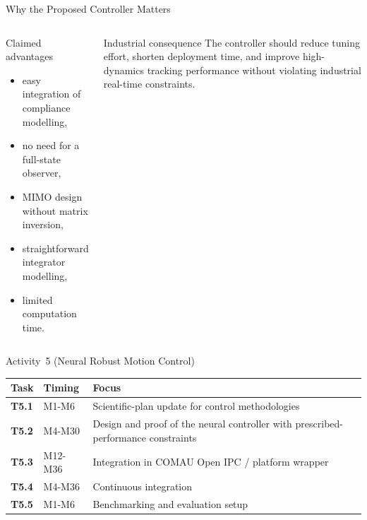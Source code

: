 \documentclass[aspectratio=169,10pt]{beamer}
\begin{document}
\begin{frame}{Why the Proposed Controller Matters}

\begin{columns}[T,totalwidth=\textwidth]
\begin{block}{Claimed advantages}
\begin{itemize}
  \item easy integration of compliance modelling,
  \item no need for a full-state observer,
  \item MIMO design without matrix inversion,
  \item straightforward integrator modelling,
  \item limited computation time.
\end{itemize}
\end{block}
\begin{block}{Industrial consequence}
The controller should reduce tuning effort, shorten deployment time, and improve high-dynamics tracking performance without violating industrial real-time constraints.
\end{block}
\end{columns}

\end{frame}


\begin{frame}{Activity~5 (Neural Robust Motion Control)}

\small
\begin{tabularx}{\textwidth}{>{\bfseries}p{} p{} X}
\toprule
Task & Timing & Focus \\
\midrule
T5.1 & M1-M6 & Scientific-plan update for control methodologies \\
T5.2 & M4-M30 & Design and proof of the neural controller with prescribed-performance constraints \\
T5.3 & M12-M36 & Integration in COMAU Open IPC / platform wrapper \\
T5.4 & M4-M36 & Continuous integration \\
T5.5 & M1-M6 & Benchmarking and evaluation setup \\
\bottomrule
\end{tabularx}

\end{frame}
\end{document}
